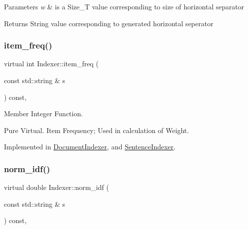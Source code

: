 \begin{DoxyParams}{Parameters}
{\em w} & is a Size\+\_\+T value corresponding to size of horizontal separator \\
\hline
\end{DoxyParams}
\begin{DoxyReturn}{Returns}
String value corresponding to generated horizontal seperator 
\end{DoxyReturn}
\mbox{\label{class_indexer_a9f9ea4d9946c531f257720cc9e9391eb}} 
\subsubsection{\texorpdfstring{item\+\_\+freq()}{item\_freq()}}
{\footnotesize\ttfamily virtual int Indexer\+::item\+\_\+freq (\begin{DoxyParamCaption}\item[{const std\+::string \&}]{s }\end{DoxyParamCaption}) const\hspace{0.3cm}{\ttfamily [protected]}, {}}



Member Integer Function. 

Pure Virtual. Item Frequency; Used in calculation of Weight. 

Implemented in \hyperlink{class_document_indexer_a302fed9a2c33a60bc7d9d7bcb03902fa}{Document\+Indexer}, and \hyperlink{class_sentence_indexer_a892b5cc701450698a04de74a3661928e}{Sentence\+Indexer}.

\mbox{\label{class_indexer_af71c69a4267217969f21cba44822f263}} 
\subsubsection{\texorpdfstring{norm\+\_\+idf()}{norm\_idf()}}
{\footnotesize\ttfamily virtual double Indexer\+::norm\+\_\+idf (\begin{DoxyParamCaption}\item[{const std\+::string \&}]{s }\end{DoxyParamCaption}) const\hspace{0.3cm}{\ttfamily [protected]}, {}}



